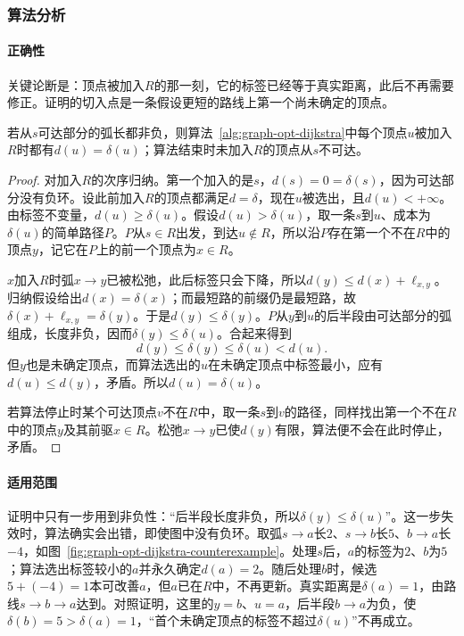 \subsubsection{算法分析}

\paragraph{正确性}
关键论断是：顶点被加入$R$的那一刻，它的标签已经等于真实距离，此后不再需要修正。证明的切入点是一条假设更短的路线上第一个尚未确定的顶点。

\begin{theorem}[Dijkstra算法的正确性]
\label{thm:graph-opt-dijkstra}
若从$s$可达部分的弧长都非负，则算法~\ref{alg:graph-opt-dijkstra}中每个顶点$u$被加入$R$时都有$d(u)=\delta(u)$；算法结束时未加入$R$的顶点从$s$不可达。
\end{theorem}

\begin{proof}
对加入$R$的次序归纳。第一个加入的是$s$，$d(s)=0=\delta(s)$，因为可达部分没有负环。设此前加入$R$的顶点都满足$d=\delta$，现在$u$被选出，且$d(u)<+\infty$。由标签不变量，$d(u)\geq\delta(u)$。假设$d(u)>\delta(u)$，取一条$s$到$u$、成本为$\delta(u)$的简单路径$P$。$P$从$s\in R$出发，到达$u\notin R$，所以沿$P$存在第一个不在$R$中的顶点$y$，记它在$P$上的前一个顶点为$x\in R$。

$x$加入$R$时弧$x\to y$已被松弛，此后标签只会下降，所以$d(y)\leq d(x)+\ell_{x,y}$。归纳假设给出$d(x)=\delta(x)$；而最短路的前缀仍是最短路，故$\delta(x)+\ell_{x,y}=\delta(y)$。于是$d(y)\leq\delta(y)$。$P$从$y$到$u$的后半段由可达部分的弧组成，长度非负，因而$\delta(y)\leq\delta(u)$。合起来得到
\[
  d(y)\leq\delta(y)\leq\delta(u)<d(u).
\]
但$y$也是未确定顶点，而算法选出的$u$在未确定顶点中标签最小，应有$d(u)\leq d(y)$，矛盾。所以$d(u)=\delta(u)$。

若算法停止时某个可达顶点$v$不在$R$中，取一条$s$到$v$的路径，同样找出第一个不在$R$中的顶点$y$及其前驱$x\in R$。松弛$x\to y$已使$d(y)$有限，算法便不会在此时停止，矛盾。
\end{proof}

\paragraph{适用范围}
证明中只有一步用到非负性：“后半段长度非负，所以$\delta(y)\leq\delta(u)$”。这一步失效时，算法确实会出错，即使图中没有负环。取弧$s\to a$长$2$、$s\to b$长$5$、$b\to a$长$-4$，如图~\ref{fig:graph-opt-dijkstra-counterexample}。处理$s$后，$a$的标签为$2$、$b$为$5$；算法选出标签较小的$a$并永久确定$d(a)=2$。随后处理$b$时，候选$5+(-4)=1$本可改善$a$，但$a$已在$R$中，不再更新。真实距离是$\delta(a)=1$，由路线$s\to b\to a$达到。对照证明，这里的$y=b$、$u=a$，后半段$b\to a$为负，使$\delta(b)=5>\delta(a)=1$，“首个未确定顶点的标签不超过$\delta(u)$”不再成立。

